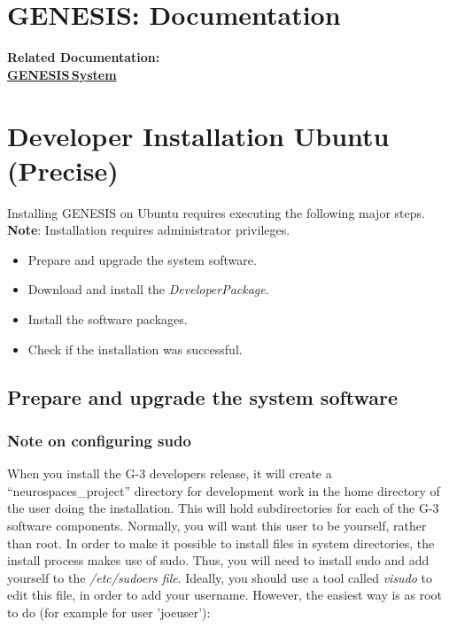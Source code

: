 \documentclass[12pt]{article}
\begin{document}
\section*{GENESIS: Documentation}

{\bf Related Documentation:} \\
\href{../genesis-system/genesis-system.tex}{\bf GENESIS\,System}

\section*{Developer Installation Ubuntu (Precise)}

Installing GENESIS on Ubuntu requires executing the following major steps. {\bf Note}: Installation requires administrator privileges.
\begin{itemize}
   \item[] Prepare and upgrade the system software.
   \item[] Download and install the {\it DeveloperPackage}.
   \item[] Install the software packages.
   \item[] Check if the installation was successful. 
\end{itemize}

\subsection*{Prepare and upgrade the system software}

\subsubsection*{Note on configuring sudo}

When you install the G-3 developers release, it will create a
``neurospaces\_project'' directory for development work in the home
directory of the user doing the installation.  This will hold
subdirectories for each of the G-3 software components.  Normally, you
will want this user to be yourself, rather than root.  In order to
make it possible to install files in system directories, the install
process makes use of sudo.  Thus, you will need to install sudo and
add yourself to the {\it /etc/sudoers file}.  Ideally, you should use
a tool called {\it visudo} to edit this file, in order to add your
username.  However, the easiest way is as root to do (for example for
user 'joeuser'):
\end{document}
